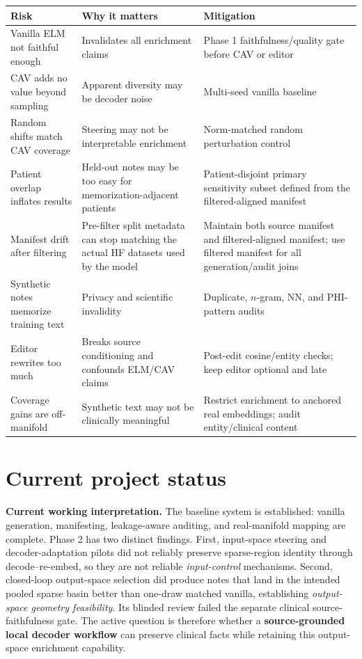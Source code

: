 \documentclass[11pt]{article}
\begin{document}
\begin{longtable}{p{4.2cm} p{5.2cm} p{5.0cm}}
\toprule
\textbf{Risk} & \textbf{Why it matters} & \textbf{Mitigation} \\
\midrule
Vanilla ELM not faithful enough &
  Invalidates all enrichment claims &
  Phase 1 faithfulness/quality gate before CAV or editor \\
CAV adds no value beyond sampling &
  Apparent diversity may be decoder noise &
  Multi-seed vanilla baseline \\
Random shifts match CAV coverage &
  Steering may not be interpretable enrichment &
  Norm-matched random perturbation control \\
Patient overlap inflates results &
  Held-out notes may be too easy for memorization-adjacent patients &
  Patient-disjoint primary sensitivity subset defined from the filtered-aligned manifest \\
Manifest drift after filtering &
  Pre-filter split metadata can stop matching the actual HF datasets used by the model &
  Maintain both source manifest and filtered-aligned manifest; use filtered manifest for all generation/audit joins \\
Synthetic notes memorize training text &
  Privacy and scientific invalidity &
  Duplicate, $n$-gram, NN, and PHI-pattern audits \\
Editor rewrites too much &
  Breaks source conditioning and confounds ELM/CAV claims &
  Post-edit cosine/entity checks; keep editor optional and late \\
Coverage gains are off-manifold &
  Synthetic text may not be clinically meaningful &
  Restrict enrichment to anchored real embeddings; audit entity/clinical content \\
\bottomrule
\end{longtable}

\section{Current project status}

\noindent\textbf{Current working interpretation.}
The baseline system is established: vanilla generation, manifesting, leakage-aware auditing, and real-manifold mapping are complete. Phase 2 has two distinct findings. First, input-space steering and decoder-adaptation pilots did not reliably preserve sparse-region identity through decode--re-embed, so they are not reliable \emph{input-control} mechanisms. Second, closed-loop output-space selection did produce notes that land in the intended pooled sparse basin better than one-draw matched vanilla, establishing \emph{output-space geometry feasibility}. Its blinded review failed the separate clinical source-faithfulness gate. The active question is therefore whether a \textbf{source-grounded local decoder workflow} can preserve clinical facts while retaining this output-space enrichment capability.
\end{document}
